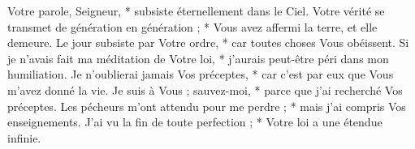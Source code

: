 Votre parole, Seigneur, * subsiste éternellement dans le Ciel.
\versseparator
Votre vérité se transmet de génération en génération ; * Vous avez affermi la terre, et elle demeure.
\versseparator
Le jour subsiste par Votre ordre, * car toutes choses Vous obéissent.
\versseparator
Si je n'avais fait ma méditation de Votre loi, * j'aurais peut-être péri dans mon humiliation.
\versseparator
Je n'oublierai jamais Vos préceptes, * car c'est par eux que Vous m'avez donné la vie.
\versseparator
Je suis à Vous ; sauvez-moi, * parce que j'ai recherché Vos préceptes.
\versseparator
Les pécheurs m'ont attendu pour me perdre ; * mais j'ai compris Vos enseignements.
\versseparator
J'ai vu la fin de toute perfection ; * Votre loi a une étendue infinie.